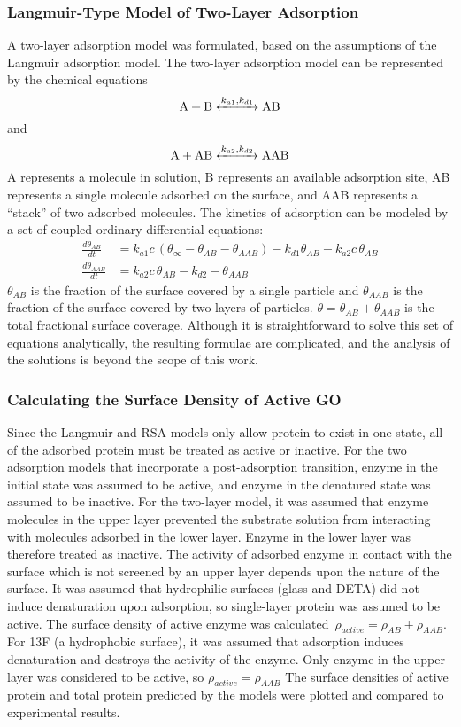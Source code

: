 \subsubsection{Langmuir-Type Model of Two-Layer Adsorption}

A two-layer adsorption model was formulated, based on the assumptions
of the Langmuir adsorption model. The two-layer adsorption model can
be represented by the chemical equations \[ \cee{A + B <->[k_{a1},k_{d1}] AB} \]
and \[ \cee{A + AB <->[k_{a2},k_{d2}] AAB} \] A represents a molecule
in solution, B represents an available adsorption site, AB represents
a single molecule adsorbed on the surface, and AAB represents a {}``stack''
of two adsorbed molecules. The kinetics of adsorption can be modeled
by a set of coupled ordinary differential equations:\begin{align}
\frac{d\theta_{AB}}{dt} & =k_{a1}c\,\left(\theta_{\infty}-\theta_{AB}-\theta_{AAB}\right)-k_{d1}\theta_{AB}-k_{a2}c\,\theta_{AB}\label{eq:Two Layer AB}\\
\frac{d\theta_{AAB}}{dt} & =k_{a2}c\,\theta_{AB}-k_{d2}-\theta_{AAB}\label{eq:Two Layer AAB}\end{align}
$\theta_{AB}$ is the fraction of the surface covered by a single
particle and $\theta_{AAB}$ is the fraction of the surface covered
by two layers of particles. $\theta=\theta_{AB}+\theta_{AAB}$ is
the total fractional surface coverage. Although it is straightforward
to solve this set of equations analytically, the resulting formulae
are complicated, and the analysis of the solutions is beyond the scope
of this work. 


\subsubsection{Calculating the Surface Density of Active GO }

Since the Langmuir and RSA models only allow protein to exist in one
state, all of the adsorbed protein must be treated as active or inactive.
For the two adsorption models that incorporate a post-adsorption transition,
enzyme in the initial state was assumed to be active, and enzyme in
the denatured state was assumed to be inactive. For the two-layer
model, it was assumed that enzyme molecules in the upper layer prevented
the substrate solution from interacting with molecules adsorbed in
the lower layer. Enzyme in the lower layer was therefore treated as
inactive. The activity of adsorbed enzyme in contact with the surface
which is not screened by an upper layer depends upon the nature of
the surface. It was assumed that hydrophilic surfaces (glass and DETA)
did not induce denaturation upon adsorption, so single-layer protein
was assumed to be active. The surface density of active enzyme was
calculated~$\rho_{active}=\rho_{AB}+\rho_{AAB}$. For 13F (a hydrophobic
surface), it was assumed that adsorption induces denaturation and
destroys the activity of the enzyme. Only enzyme in the upper layer
was considered to be active, so $\rho_{active}=\rho_{AAB}$ The surface
densities of active protein and total protein predicted by the models
were plotted and compared to experimental results. 


